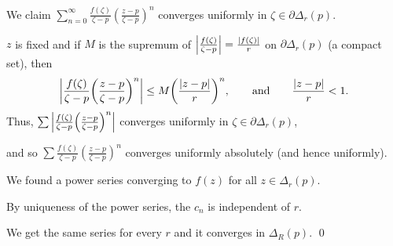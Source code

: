 \documentclass[10pt,aspectratio=169]{beamer}
\begin{document}
\begin{frame}
We claim
\quad
$\displaystyle \sum_{n=0}^\infty
\frac{f(\zeta)}{\zeta-p}
{\left(\frac{z-p}{\zeta-p}\right)}^n$
\quad
converges uniformly in $\zeta \in \partial \Delta_r(p)$.

\pause
\medskip

$z$ is fixed and if $M$ is the supremum of $\left\lvert {\frac{f(\zeta)}{\zeta-p}} \right\rvert =
\frac{\lvert {f(\zeta)} \rvert}{r}$ on $\partial \Delta_r(p)$ (a compact set),
\pause
then
\begin{equation*}
\left\lvert {
\frac{f(\zeta)}{\zeta-p}
{\left(\frac{z-p}{\zeta-p}\right)}^n
} \right\rvert
\leq
M 
{\left(\frac{\left\lvert {z-p} \right\rvert}{r}\right)}^n,
\qquad \text{and} \qquad
\frac{\left\lvert {z-p} \right\rvert}{r} < 1 .
\end{equation*}
\pause
Thus, $\sum 
\left\lvert {
\frac{f(\zeta)}{\zeta-p}
{\left(\frac{z-p}{\zeta-p}\right)}^n
} \right\rvert$ converges uniformly in $\zeta \in \partial \Delta_r(p)$,
\pause
\medskip

and so
$\sum 
\frac{f(\zeta)}{\zeta-p}
{\left(\frac{z-p}{\zeta-p}\right)}^n$ converges uniformly absolutely
(and hence uniformly).

\medskip
\pause

We found a power series converging to $f(z)$ for all $z \in \Delta_r(p)$.

\pause
\medskip

By uniqueness of the power series, the $c_n$ is independent of $r$.

\medskip
\pause

We get the same series for every $r$ and it converges in $\Delta_R(p)$.
\qed

\end{frame}
\end{document}
